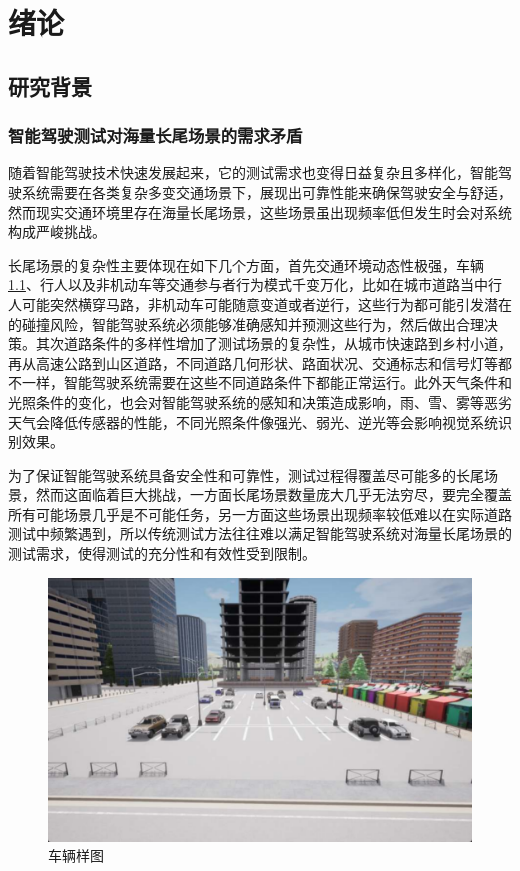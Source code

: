 \chapter{绪论}
\section{研究背景}
\subsection{智能驾驶测试对海量长尾场景的需求矛盾}
随着智能驾驶技术快速发展起来，它的测试需求也变得日益复杂且多样化，智能驾驶系统需要在各类复杂多变交通场景下\cite{abeysirigoonawardena2019adversarial}，展现出可靠性能来确保驾驶安全与舒适，然而现实交通环境里存在海量长尾场景，这些场景虽出现频率低但发生时会对系统构成严峻挑战。

长尾场景的复杂性主要体现在如下几个方面，首先交通环境动态性极强，车辆\ref{fig:vehicle_sample}、行人以及非机动车等交通参与者行为模式千变万化，比如在城市道路当中行人可能突然横穿马路，非机动车可能随意变道或者逆行，\cite{bagschik2018ontology}这些行为都可能引发潜在的碰撞风险，智能驾驶系统必须能够准确感知并预测这些行为，然后做出合理决策。其次道路条件的多样性增加了测试场景的复杂性\cite{biggio2013evasion}，从城市快速路到乡村小道，再从高速公路到山区道路，不同道路几何形状、路面状况、交通标志和信号灯等都不一样，智能驾驶系统需要在这些不同道路条件下都能正常运行\cite{brown2020language}。此外天气条件和光照条件的变化，也会对智能驾驶系统的感知和决策造成影响，雨、雪、雾等恶劣天气会降低传感器的性能，不同光照条件像强光、弱光、逆光等会影响视觉系统识别效果。

为了保证智能驾驶系统具备安全性和可靠性，测试过程得覆盖尽可能多的长尾场景，然而这面临着巨大挑战，一方面长尾场景数量庞大几乎无法穷尽，要完全覆盖所有可能场景几乎是不可能任务，另一方面这些场景出现频率较低难以在实际道路测试中频繁遇到，所以传统测试方法往往难以满足智能驾驶系统对海量长尾场景的测试需求，使得测试的充分性和有效性受到限制\cite{cai2020summit}。
\begin{figure}[h]
	\centering
	\includegraphics[width=1.0\textwidth]{"images/车辆样式图.pdf"}
	\caption{车辆样图}
	\label{fig:vehicle_sample}
\end{figure}
